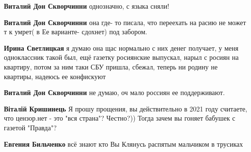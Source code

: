 \begin{itemize}
\begin{itemize}
\textbf{Виталий Дон Скворчинни} однозначно, с языка сняли!

 
\textbf{Виталий Дон Скворчинни} она где- то писала, что переехать на расию не может т к умрет( в Ее варианте- сдохнет) под забором.

 
\textbf{Ирина Светлицкая} я думаю она щас нормально с них денег получает, у меня одноклассник такой был, ещё газетку росиянские выпускал, нарыл с росиян на квартиру, потом за ним таки СБУ пришла, сбежал, теперь ни родину не квартиры, надеюсь ее конфискуют

 
\textbf{Виталий Дон Скворчинни} не думаю, оч мало россиян ее поддерживают.

 
\textbf{Віталій Кришинець} Я прошу прощения, вы действительно в 2021 году считаете, что цензор.нет - это "вся страна"? Честно?)) Тогда зачем вы гоняет бабушек с газетой "Правда"?

 
\textbf{Евгения Бильченко} всё знают кто Вы
Клянусь распятым мальчиком в трусиках

 

\end{itemize}
\end{itemize}
